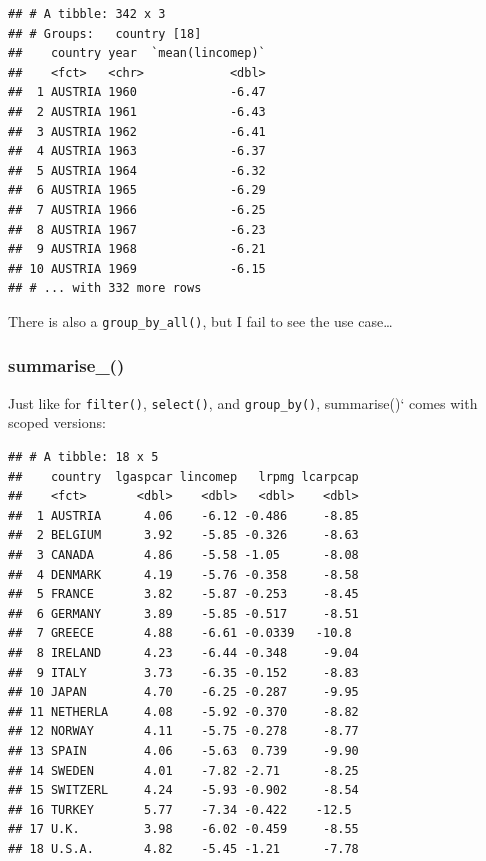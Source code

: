 \documentclass[]{gitbook}
\newenvironment{Shaded}{\begin{snugshade}}{\end{snugshade}}
\newcommand{\KeywordTok}[1]{\textcolor[rgb]{0.13,0.29,0.53}{\textbf{#1}}}
\newcommand{\NormalTok}[1]{#1}
\newcommand{\OperatorTok}[1]{\textcolor[rgb]{0.81,0.36,0.00}{\textbf{#1}}}
\newcommand{\StringTok}[1]{\textcolor[rgb]{0.31,0.60,0.02}{#1}}
\begin{document}
\begin{verbatim}
## # A tibble: 342 x 3
## # Groups:   country [18]
##    country year  `mean(lincomep)`
##    <fct>   <chr>            <dbl>
##  1 AUSTRIA 1960             -6.47
##  2 AUSTRIA 1961             -6.43
##  3 AUSTRIA 1962             -6.41
##  4 AUSTRIA 1963             -6.37
##  5 AUSTRIA 1964             -6.32
##  6 AUSTRIA 1965             -6.29
##  7 AUSTRIA 1966             -6.25
##  8 AUSTRIA 1967             -6.23
##  9 AUSTRIA 1968             -6.21
## 10 AUSTRIA 1969             -6.15
## # ... with 332 more rows
\end{verbatim}

There is also a \texttt{group\_by\_all()}, but I fail to see the use case\ldots{}

\hypertarget{summarise_}{%
\subsubsection{summarise\_()}\label{summarise_}}

Just like for \texttt{filter()}, \texttt{select()}, and \texttt{group\_by()}, summarise()` comes with scoped versions:

\begin{Shaded}
\end{Shaded}

\begin{verbatim}
## # A tibble: 18 x 5
##    country  lgaspcar lincomep   lrpmg lcarpcap
##    <fct>       <dbl>    <dbl>   <dbl>    <dbl>
##  1 AUSTRIA      4.06    -6.12 -0.486     -8.85
##  2 BELGIUM      3.92    -5.85 -0.326     -8.63
##  3 CANADA       4.86    -5.58 -1.05      -8.08
##  4 DENMARK      4.19    -5.76 -0.358     -8.58
##  5 FRANCE       3.82    -5.87 -0.253     -8.45
##  6 GERMANY      3.89    -5.85 -0.517     -8.51
##  7 GREECE       4.88    -6.61 -0.0339   -10.8 
##  8 IRELAND      4.23    -6.44 -0.348     -9.04
##  9 ITALY        3.73    -6.35 -0.152     -8.83
## 10 JAPAN        4.70    -6.25 -0.287     -9.95
## 11 NETHERLA     4.08    -5.92 -0.370     -8.82
## 12 NORWAY       4.11    -5.75 -0.278     -8.77
## 13 SPAIN        4.06    -5.63  0.739     -9.90
## 14 SWEDEN       4.01    -7.82 -2.71      -8.25
## 15 SWITZERL     4.24    -5.93 -0.902     -8.54
## 16 TURKEY       5.77    -7.34 -0.422    -12.5 
## 17 U.K.         3.98    -6.02 -0.459     -8.55
## 18 U.S.A.       4.82    -5.45 -1.21      -7.78
\end{verbatim}
\end{document}
